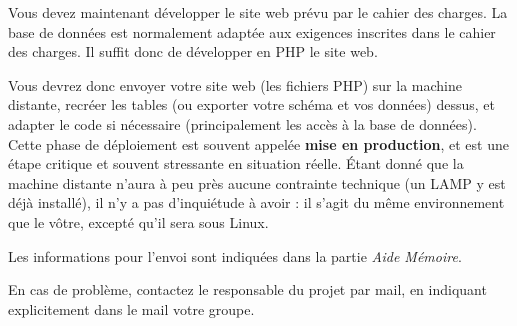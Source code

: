 

\vspace*{0.7cm}

\noindent {}

\bigskip

\noindent Vous devez maintenant développer le site web prévu par le cahier des charges.
La base de données est normalement adaptée aux exigences inscrites dans le cahier des charges.
Il suffit donc de développer en PHP le site web.

\bigskip

\noindent Vous devrez donc envoyer votre site web (les fichiers PHP) sur la machine distante, recréer les tables (ou exporter votre schéma et vos données) dessus, et adapter le code si nécessaire (principalement les accès à la base de données).
Cette phase de déploiement est souvent appelée \textbf{mise en production}, et est une étape critique et souvent stressante en situation réelle.
\'Etant donné que la machine distante n'aura à peu près aucune contrainte technique (un LAMP y est déjà installé), il n'y a pas d'inquiétude à avoir : il s'agit du même environnement que le vôtre, excepté qu'il sera sous Linux.

\bigskip

\noindent Les informations pour l'envoi sont indiquées dans la partie \textit{Aide Mémoire}.

\bigskip

\noindent En cas de problème, contactez le responsable du projet par mail, en indiquant explicitement dans le mail votre groupe.

